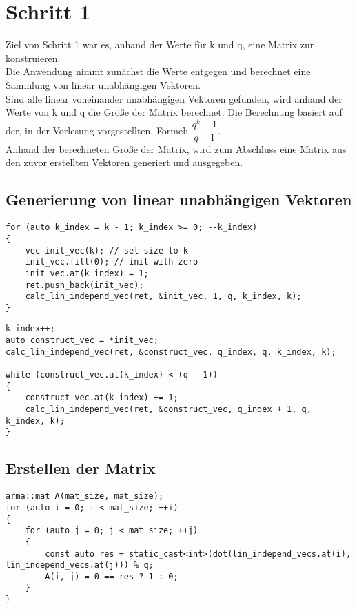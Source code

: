 \section{Schritt 1}
Ziel von Schritt 1 war es, anhand der Werte für k und q, eine Matrix zur konstruieren. \\
Die Anwendung nimmt zunächst die Werte  entgegen und berechnet eine Sammlung von linear unabhängigen Vektoren.\\
Sind alle linear voneinander unabhängigen Vektoren gefunden, wird anhand der Werte von k und q die Größe der Matrix berechnet. Die Berechnung basiert auf der, in der Vorlesung vorgestellten, Formel: $\dfrac{q^{k}-1}{q-1}$. \\
Anhand der berechneten Größe der Matrix, wird zum Abschluss eine Matrix aus den zuvor erstellten Vektoren generiert und ausgegeben.
\subsection{Generierung von linear unabhängigen Vektoren}
\begin{lstlisting}[caption=Generierung der Vektoren]
for (auto k_index = k - 1; k_index >= 0; --k_index)
{
	vec init_vec(k); // set size to k
	init_vec.fill(0); // init with zero
	init_vec.at(k_index) = 1;
	ret.push_back(init_vec);
	calc_lin_independ_vec(ret, &init_vec, 1, q, k_index, k);
}	
\end{lstlisting}
\begin{lstlisting}[caption=Berechnung der linearen Unabhängigkeiten]
k_index++;
auto construct_vec = *init_vec;
calc_lin_independ_vec(ret, &construct_vec, q_index, q, k_index, k);
	
while (construct_vec.at(k_index) < (q - 1))
{
	construct_vec.at(k_index) += 1;
	calc_lin_independ_vec(ret, &construct_vec, q_index + 1, q, k_index, k);
}
\end{lstlisting}

\subsection{Erstellen der Matrix}
\begin{lstlisting}[caption=Erstellen der Generatormatrix]
arma::mat A(mat_size, mat_size);
for (auto i = 0; i < mat_size; ++i)
{
	for (auto j = 0; j < mat_size; ++j)
	{
		const auto res = static_cast<int>(dot(lin_independ_vecs.at(i), lin_independ_vecs.at(j))) % q;
		A(i, j) = 0 == res ? 1 : 0;
	}
}
\end{lstlisting}
  
